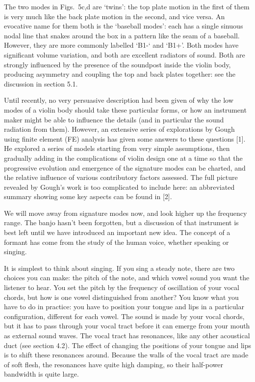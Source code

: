   The two modes in Figs.\ 5c,d are `twins': the top plate motion in the first 
  of them is very much like the back plate motion in the second, and vice 
  versa. An evocative name for them both is the `baseball modes': each has a 
  single sinuous nodal line that snakes around the box in a pattern like the 
  seam of a baseball. However, they are more commonly labelled `B1-` and `B1+'. 
  Both modes have significant volume variation, and both are excellent 
  radiators of sound. Both are strongly influenced by the presence of the 
  soundpost inside the violin body, producing asymmetry and coupling the top 
  and back plates together: see the discussion in section 5.1. 

  Until recently, no very persuasive description had been given of why the low 
  modes of a violin body should take these particular forms, or how an 
  instrument maker might be able to influence the details (and in particular 
  the sound radiation from them). However, an extensive series of explorations 
  by Gough using finite element (FE) analysis has given some answers to these 
  questions [1]. He explored a series of models starting from very simple 
  assumptions, then gradually adding in the complications of violin design one 
  at a time so that the progressive evolution and emergence of the signature 
  modes can be charted, and the relative influence of various contributory 
  factors assessed. The full picture revealed by Gough’s work is too 
  complicated to include here: an abbreviated summary showing some key aspects 
  can be found in [2]. 

  We will move away from signature modes now, and look higher up the frequency 
  range. The banjo hasn't been forgotten, but a discussion of that instrument 
  is best left until we have introduced an important new idea. The concept of a 
  formant has come from the study of the human voice, whether speaking or 
  singing. 

  It is simplest to think about singing. If you sing a steady note, there are 
  two choices you can make: the pitch of the note, and which vowel sound you 
  want the listener to hear. You set the pitch by the frequency of oscillation 
  of your vocal chords, but how is one vowel distinguished from another? You 
  know what you have to do in practice: you have to position your tongue and 
  lips in a particular configuration, different for each vowel. The sound is 
  made by your vocal chords, but it has to pass through your vocal tract before 
  it can emerge from your mouth as external sound waves. The vocal tract has 
  resonances, like any other acoustical duct (see section 4.2). The effect of 
  changing the positions of your tongue and lips is to shift these resonances 
  around. Because the walls of the vocal tract are made of soft flesh, the 
  resonances have quite high damping, so their half-power bandwidth is quite 
  large. 

